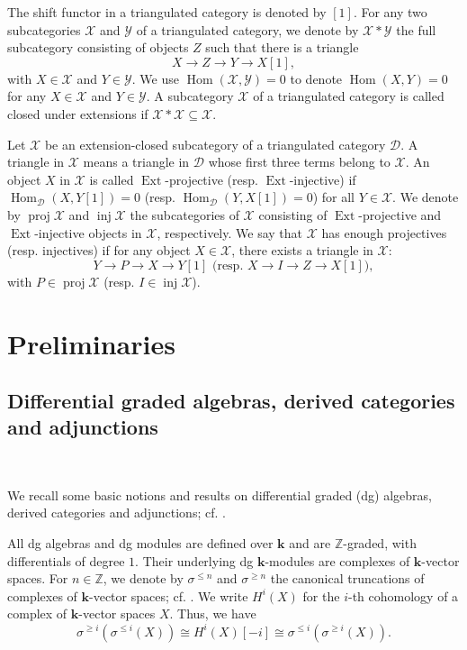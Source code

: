 \documentclass[11pt,a4paper,reqno]{amsart}
\theoremstyle{plain}
\numberwithin{equation}{section}
\theoremstyle{definition}
\newcommand{\Hom}{\operatorname{Hom}}
\newcommand{\Ext}{\operatorname{Ext}}
\newcommand{\Proj}{\operatorname{proj}}
\newcommand{\Inj}{\operatorname{inj}}
\renewcommand{\k}{\mathbf{k}}
\newcommand{\D}{\mathcal{D}}
\newcommand{\X}{\mathcal{X}}
\newcommand{\Y}{\mathcal{Y}}
\begin{document}
The shift functor in a triangulated category is denoted by $[1]$. For any two subcategories $\X$ and $\Y$ of a triangulated category, we denote by $\X*\Y$ the full subcategory consisting of objects $Z$ such that there is a triangle
\[X\to Z\to Y\to X[1],\]
with $X\in\X$ and $Y\in\Y$. We use $\Hom(\X,\Y)=0$ to denote $\Hom(X,Y)=0$ for any $X\in\X$ and $Y\in\Y$. A subcategory $\X$ of a triangulated category is called closed under extensions if $\X*\X\subseteq\X$. 

Let $\X$ be an extension-closed subcategory of a triangulated category $\D$. A triangle in $\X$ means a triangle in $\D$ whose first three terms belong to $\X$. An object $X$ in $\X$ is called $\Ext$-projective (resp. $\Ext$-injective) if $\Hom_{\D}(X,Y[1])=0$ (resp. $\Hom_{\D}(Y,X[1])=0$) for all $Y\in\X$. We denote by $\Proj\X$ and $\Inj\X$ the subcategories of $\X$ consisting of $\Ext$-projective and $\Ext$-injective objects in $\X$, respectively. We say that $\X$ has enough projectives (resp. injectives) if for any object $X\in\X$, there exists a triangle in $\X$:
\[Y\to P\to X\to Y[1]\text{ (resp. $X\to I\to Z\to X[1]$)},\]
with $P\in\Proj\X$ (resp. $I\in\Inj\X$).

\section{Preliminaries}\label{sec:pre}

\subsection{Differential graded algebras, derived categories and adjunctions}\label{subsec:dg-pre}\ 

We recall some basic notions and results on differential graded (dg) algebras, derived categories and adjunctions; cf. \cite{Ke1,Ke2,Kr,Rie,Y}.

All dg algebras and dg modules are defined over $\k$ and are $\mathbb Z$-graded, with differentials of degree $1$. Their underlying dg $\k$-modules are complexes of $\k$-vector spaces. For $n\in\mathbb Z$, we denote by $\sigma^{\leq n}$ and $\sigma^{\geq n}$ the canonical truncations of complexes of $\k$-vector spaces; cf. \cite[Appendix~A]{Z}. We write $H^i(X)$ for the $i$-th cohomology of a complex of $\k$-vector spaces $X$. Thus, we have
\[\sigma^{\geq i}(\sigma^{\leq i}(X))\cong H^i(X)[-i]\cong \sigma^{\leq i}(\sigma^{\geq i}(X)).\]
\end{document}

